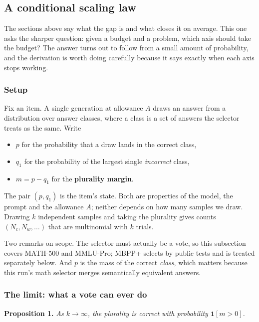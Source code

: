 \documentclass[11pt]{article}
\begin{document}
\subsection{A conditional scaling law}

The sections above say what the gap is and what closes it on average. This one asks the sharper
question: given a budget and a problem, which axis should take the budget? The answer turns out to
follow from a small amount of probability, and the derivation is worth doing carefully because it
says exactly when each axis stops working.

\subsubsection*{Setup}

Fix an item. A single generation at allowance $A$ draws an answer from a distribution over answer
classes, where a class is a set of answers the selector treats as the same. Write

\begin{itemize}
\itemsep2pt
\item $p$ for the probability that a draw lands in the correct class,
\item $q_1$ for the probability of the largest single \emph{incorrect} class,
\item $m = p - q_1$ for the \textbf{plurality margin}.
\end{itemize}

The pair $(p, q_1)$ is the item's state. Both are properties of the model, the prompt and the
allowance $A$; neither depends on how many samples we draw. Drawing $k$ independent samples and
taking the plurality gives counts $(N_c, N_w, \dots)$ that are multinomial with $k$ trials.

Two remarks on scope. The selector must actually be a vote, so this subsection covers MATH-500 and
MMLU-Pro; MBPP+ selects by public tests and is treated separately below. And $p$ is the mass of the
correct \emph{class}, which matters because this run's math selector merges semantically equivalent
answers.

\subsubsection*{The limit: what a vote can ever do}

\textbf{Proposition 1.} \emph{As $k \to \infty$, the plurality is correct with probability
$\mathbf{1}[m > 0]$.}
\end{document}

